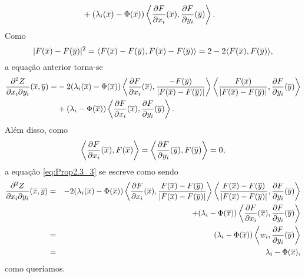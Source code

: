 \begin{demonstracao}
\begin{eqnarray*}
\begin{aligned}
&+ 
(\lambda_i(\overline{x}) - \Phi(\overline{x})) \left\langle \frac{\partial F}{\partial x_i}(\overline{x}), \frac{\partial F}{\partial y_i}(\overline{y}) \right\rangle.
\end{aligned}
\end{eqnarray*}	
Como 
\[
|F(\overline{x}) - F(\overline{y})|^2 = \langle F(\overline{x}) - F(\overline{y}), F(\overline{x}) - F(\overline{y}) \rangle = 
2 - 2 \langle F(\overline{x}), F(\overline{y}) \rangle,
\]
a equa\c c\~ao anterior torna-se
\begin{eqnarray} \label{eq:Prop2.3_3}
\begin{aligned}
\frac{\partial^2 Z}{\partial x_i \partial y_i}(\overline{x},\overline{y}) = & 
-2 (\lambda_i(\overline{x}) - \Phi(\overline{x})) \left\langle \frac{\partial F}{\partial x_i}(\overline{x}), 
\frac{-F(\overline{y})}{|F(\overline{x}) - F(\overline{y})|} \right\rangle \left\langle \frac{F(\overline{x})}{|F(\overline{x}) - 
F(\overline{y})|}, \frac{\partial F}{\partial y_i}(\overline{y}) \right\rangle \\
& + 
(\lambda_i - \Phi(\overline{x})) \left\langle \frac{\partial F}{\partial x_i}(\overline{x}), 
\frac{\partial F}{\partial y_i}(\overline{y}) \right\rangle.
\end{aligned}
\end{eqnarray}	
Al\'em disso, como
\[
\left\langle \frac{\partial F}{\partial x_i}(\overline{x}), F(\overline{x}) \right\rangle = 
\left\langle \frac{\partial F}{\partial y_i}(\overline{y}), F(\overline{y}) \right\rangle = 0,
\]
a equação \eqref{eq:Prop2.3_3} se escreve como sendo
\begin{eqnarray*}
\frac{\partial^2 Z}{\partial x_i \partial y_i}(\overline{x},\overline{y}) & = &
-2 (\lambda_i(\overline{x}) - \Phi(\overline{x})) \left\langle \frac{\partial F}{\partial x_i}(\overline{x}), \frac{F(\overline{x}) -F(\overline{y})}{|F(\overline{x}) - F(\overline{y})|} \right\rangle \left\langle 
\frac{F(\overline{x}) - F(\overline{y})}{|F(\overline{x}) - F(\overline{y})|}, \frac{\partial F}{\partial y_i}(\overline{y}) 
\right\rangle \\
&& + 
(\lambda_i - \Phi(\overline{x})) \left\langle \frac{\partial F}{\partial x_i}(\overline{x}), 
\frac{\partial F}{\partial y_i}(\overline{y}) \right\rangle \\
&= &
(\lambda_i - \Phi(\overline{x})) \left\langle w_i,\frac{\partial F}{\partial y_i}(\overline{y})
\right\rangle \\
&= & \lambda_i - \Phi(\overline{x}),
\end{eqnarray*}	
como quer\'iamos.
\end{demonstracao}


